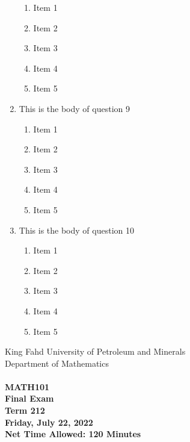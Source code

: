 \documentclass[amsfonts,bezier,leqno,fleqn,12pt,a4paper]{article}
\begin{document}
\begin{large}
\begin{enumerate}
\begin{enumerate}
\item Item 1
\item Item 2
\item Item 3
\item Item 4
\item Item 5

\end{enumerate}
\newpage


\item This is the body of question 9
\vspace {0.3in}
\setcounter{equation}{0}

\begin{enumerate}
\item Item 1
\item Item 2
\item Item 3
\item Item 4
\item Item 5

\end{enumerate}

\vspace {3.5cm}


\item This is the body of question 10
\vspace {0.3in}
\setcounter{equation}{0}

\begin{enumerate}
\item Item 1
\item Item 2
\item Item 3
\item Item 4
\item Item 5

\end{enumerate}
\newpage


\end{enumerate}
\end{large}



\newpage


\thispagestyle{empty}
\begin{center}
    \begin{large}
        King Fahd University of Petroleum and Minerals \\ 
        Department of Mathematics  \\ 
        \vspace*{4.5cm}
        {\bf {} }  \hfill {\bf {}} \\
        {\bf MATH101 }  \\
        {\bf Final Exam }  \\
        {\bf Term 212 }  \\
        {\bf Friday, July 22, 2022 }  \\ 
        {\bf Net Time Allowed: 120 Minutes }  \\
        \vspace*{0.2cm}

    \end{large}
\end{center}
\end{document}

